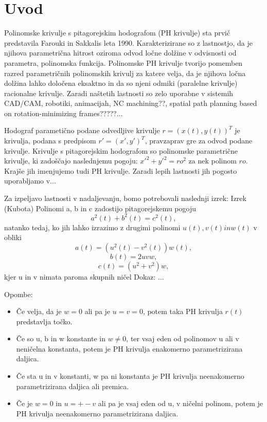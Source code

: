 \documentclass[12pt]{article}
\begin{document}
\section{Uvod}
Polinomske krivulje s pitagorejskim hodografom (PH krivulje) sta prvič predstavila Farouki in Sakkalis leta 1990.
Karakterizirane so z lastnostjo, da je njihova parametrična hitrost oziroma odvod ločne dolžine v odvisnosti od parametra,
polinomska funkcija. Polinomske PH krivulje tvorijo pomemben razred parametričnih polinomskih krivulj
za katere velja, da je njihova ločna dolžina lahko določena eksaktno in da so njeni odmiki (paralelne krivulje) racionalne krivulje.
Zaradi naštetih lastnosti so zelo uporabne v sistemih CAD/CAM, robotiki, animacijah, NC machining??, spatial path planning based on rotation-minimizing frames?????...


Hodograf parametično podane odvedljive krivulje $r = (x(t), y(t))^T$ je krivulja, 
podana s predpisom $r' = (x', y')^T$, pravzaprav gre za odvod podane krivulje. 
Krivulje s pitagorejskim hodografom so polinomske parametrične krivulje, 
ki zadoščajo naslednjemu pogoju:
$x'^2 + y'^2 = ro^2$ za nek polinom $ro$.
Krajše jih imenjujemo tudi PH krivulje. 
Zaradi lepih lastnosti jih pogosto uporabljamo v...

Za izpeljavo lastnosti v nadaljevanju, bomo potrebovali naslednji izrek:
Izrek (Kubota)
Polinomi a, b in c zadostijo pitagorejskemu pogoju
$$a^2(t) + b^2(t) = c^2(t),$$
natanko tedaj, ko jih lahko izrazimo z drugimi polinomi $u(t), v(t) in w(t)$ v obliki
$$a(t) = (u^2(t) - v^2(t))w(t),$$
$$b(t) = 2uvw,$$
$$c(t) = (u^2 + v^2)w,$$
kjer u in v nimata paroma skupnih ničel
Dokaz: ...

Opombe:
\begin{itemize}
	\item Če velja, da je $w=0$ ali pa je $u=v=0$, potem taka PH krivulja $r(t)$ predstavlja točko.
	\item Če so u, b in w konstante in $w \neq 0$, ter vsaj eden od polinomov u ali v neničelna konstanta,
	potem je PH krivulja enakomerno parametrizirana daljica.
	\item Če sta u in v konstanti, w pa ni konstanta je PH krivulja neenakomerno parametrizirana daljica ali premica.
	\item Če je $w = 0$ in $u = +-v$ ali pa je vsaj eden od u, v ničelni polinom, 
	potem je PH krivulja neenakomerno parametrizirana daljica.
\end{itemize}
\end{document}
